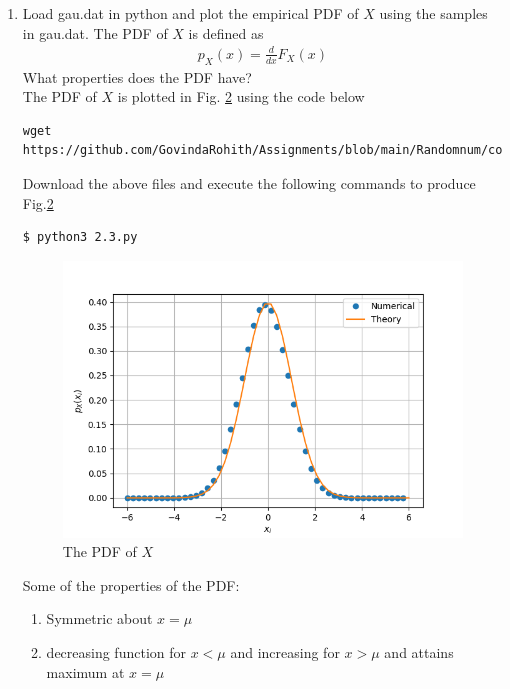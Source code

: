 \documentclass[journal,12pt,twocolumn]{IEEEtran}
\begin{document}
\begin{enumerate}[label=\thesection.\arabic*
,ref=\thesection.\theenumi]
\begin{figure}[!h]
\caption{The CDF of $X$}
\label{fig:2.2}
\end{figure}
Some of the properties of CDF 
\begin{enumerate}
    \item $F_X(x)$ is non decreasing function.
    \item Symmetric about one point.
\end{enumerate}
\item
Load gau.dat in python and plot the empirical PDF of $X$ using the samples in gau.dat. The PDF of $X$ is defined as
\begin{align}
p_{X}(x) = \frac{d}{dx}F_{X}(x)
\end{align}
What properties does the PDF have?
\\
\solution The PDF of $X$ is plotted in Fig. \ref{fig:2.3} using the code below
\begin{lstlisting}
wget https://github.com/GovindaRohith/Assignments/blob/main/Randomnum/codes/2.3.py
\end{lstlisting}
Download the above files and execute the following commands to produce Fig.\ref{fig:2.3}
\begin{lstlisting}
$ python3 2.3.py
\end{lstlisting}
\begin{figure}[!h]
\centering
\includegraphics[width=\columnwidth]{./figs/2.3.png}
\caption{The PDF of $X$}
\label{fig:2.3}
\end{figure}
Some of the properties of the PDF:
\begin{enumerate}
    \item Symmetric about $x=\mu$
    \item decreasing function for $x<\mu$ and increasing for $x>\mu$ and attains maximum at $x=\mu$

\end{enumerate}
\end{enumerate}
\end{document}
